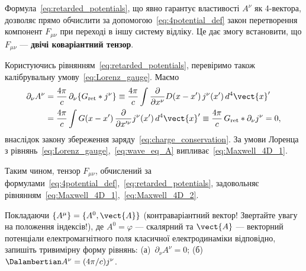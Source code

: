 Формула~\eqref{eq:retarded_potentials}, що явно гарантує властивості $A^{\nu}$ як 4-вектора, дозволяє прямо обчислити за допомогою~\eqref{eq:4potential_def} закон перетворення компонент $F_{\mu\nu}$ при переході в іншу систему відліку. Це дає змогу встановити, що $F_{\mu\nu}$ --- \textbf{двічі коваріантний тензор}.

Користуючись рівнянням~\eqref{eq:retarded_potentials}, перевіримо також калібрувальну умову~\eqref{eq:Lorenz_gauge}. Маємо
\begin{align*}
    \partial_{\nu}A^{\nu}
    &= \frac{4\pi}{c}\,\partial_{\nu}\{G_{\text{ret}}*j^{\nu}\}
    \equiv \frac{4\pi}{c}\int\frac{\partial}{\partial x^{\nu}}D(x-x')\,j^{\nu}(x')\,d^4\vect{x}' \\
    &= \frac{4\pi}{c}\int G(x-x')\,\frac{\partial}{\partial x'^{\nu}}j^{\nu}(x')\,d^4\vect{x}'
    \equiv \frac{4\pi}{c}\,G_{\text{ret}}*\partial_{\nu}j^{\nu} = 0,
\end{align*}
внаслідок закону збереження заряду~\eqref{eq:charge_conservation}. За умови Лоренца з рівнянь~\eqref{eq:Lorenz_gauge},~\eqref{eq:wave_eq_A} випливає~\eqref{eq:Maxwell_4D_1}.

Таким чином, тензор $F_{\mu\nu}$, обчислений за формулами~\eqref{eq:4potential_def},~\eqref{eq:retarded_potentials}, задовольняє рівнянням~\eqref{eq:Maxwell_4D_1},~\eqref{eq:Maxwell_4D_2}.

\begin{problem}
Покладаючи $\{A^{\mu}\}=\{A^0,\vect{A}\}$ (контраваріантний вектор! Звертайте увагу на положення індексів!), де $A^0=\varphi$ --- скалярний та $\vect{A}$ --- векторний потенціали електромагнітного поля класичної електродинаміки відповідно, запишіть тривимірну форму рівнянь: (а)~$\partial_{\nu}A^{\nu}=0$; (б)~$\Dalambertian A^{\nu}=(4\pi/c)j^{\nu}$.
\end{problem}